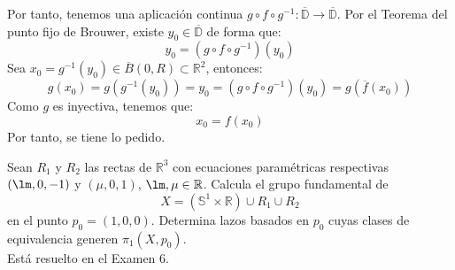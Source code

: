 \documentclass[12pt]{article}
\begin{document}
\begin{ejercicio}[5 puntos]
\begin{enumerate}[label=\alph*)]
                Por tanto, tenemos una aplicación continua ${g\circ f\circ g^{-1}}:\overline{\mathbb{D}}\to \overline{\mathbb{D}}$. Por el Teorema del punto fijo de Brouwer, existe $y_0\in \overline{\mathbb{D}}$ de forma que:
                \begin{equation*}
                    y_0 = ({g\circ f\circ g^{-1}})(y_0)
                \end{equation*}
                Sea $x_0 = g^{-1}(y_0)\in \overline{B}(0,R)\subset \mathbb{R}^2$, entonces:
                \begin{equation*}
                    g(x_0) = g(g^{-1}(y_0)) = y_0 = ({g\circ f\circ g^{-1}})(y_0) = g(\overline{f}(x_0))
                \end{equation*}
                Como $g$ es inyectiva, tenemos que:
                \begin{equation*}
                    x_0 = {f}(x_0)
                \end{equation*}
                Por tanto, se tiene lo pedido.
        \end{enumerate}
    \end{ejercicio}

    \begin{ejercicio}
        Sean $R_1$ y $R_2$ las rectas de $\mathbb{R}^3$ con ecuaciones paramétricas respectivas $(\lm,0,-1)$ y $(\mu,0,1)$, $\lm,\mu\in \mathbb{R}$. Calcula el grupo fundamental de
        \begin{equation*}
            X = (\mathbb{S}^1\times \mathbb{R}) \cup R_1 \cup R_2
        \end{equation*}
        en el punto $p_0 = (1,0,0)$. Determina lazos basados en $p_0$ cuyas clases de equivalencia generen $\pi_1(X,p_0)$.\\

        \noindent
        Está resuelto en el Examen 6.
    \end{ejercicio}
\end{document}
